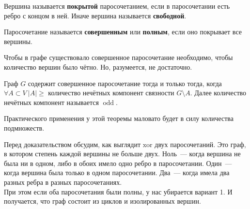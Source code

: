 \documentclass{article}
\begin{document}
    \begin{definition}
        Вершина называется \textbf{покрытой} паросочетанием, если в паросочетании есть ребро с концом в ней. Иначе вершина называется \textbf{свободной}.
    \end{definition}
    \begin{definition}
        Паросочетание называется \textbf{совершенным} или \textbf{полным}, если оно покрывает все вершины.
    \end{definition}
    \begin{remark}
        Чтобы в графе существовало совершенное паросочетание необходимо, чтобы количество вершин было чётно. Но, разумеется, не достаточно.
    \end{remark}
    \begin{theorem}
        Граф $G$ содержит совершенное паросочетание тогда и только тогда, когда $\forall A\subset V~|A|\geqslant$ количество нечётных компонент связности $G\setminus A$. Далее количество нечётных компонент называется $\operatorname{odd}$.
    \end{theorem}
    \begin{remark}
        Практического применения у этой теоремы маловато будет в силу количества подмножеств.
    \end{remark}
    \begin{remark}
        Перед доказательством обсудим, как выглядит $\mathrm{xor}$ двух паросочетаний. Это граф, в котором степень каждой вершины не больше двух. Ноль~--- когда вершина не была ни в одном, либо в обоих имело одно ребро в паросочетании. Один~--- когда вершина была только в одном паросочетании. Два~--- когда имела два разных ребра в разных паросочетаниях.\\
        При этом если оба паросочетания были полны, у нас убирается вариант 1. И получается, что граф состоит из циклов и изолированных вершин.
    \end{remark}
\end{document}

